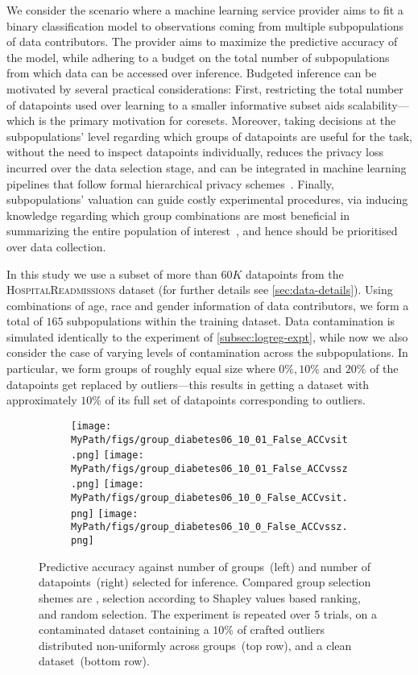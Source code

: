 We consider the scenario where a machine learning service provider aims to fit a binary classification model to observations coming from multiple subpopulations of data contributors. The provider aims to maximize the predictive accuracy of the model, while adhering to a budget on the total number of subpopulations from which data can be accessed over inference. Budgeted inference can be motivated by several practical considerations: First, restricting the total number of datapoints used over learning to a smaller informative subset aids scalability---which is the primary motivation for coresets. Moreover, taking decisions at the subpopulations' level regarding which groups of datapoints are useful for the task, without the need to inspect datapoints individually, reduces the privacy loss incurred over the data selection stage, and can be integrated in machine learning pipelines that follow formal hierarchical privacy schemes~\citep{balle19}. Finally, subpopulations' valuation can guide costly experimental procedures, via inducing knowledge regarding which group combinations are most beneficial in summarizing the entire population of interest~\citep{pinsler19, vahidian20}, and hence should be prioritised over data collection.

In this study we use a subset of more than $60K$ datapoints from the \textsc{HospitalReadmissions} dataset (for further details see \cref{sec:data-details}). Using combinations of age, race and gender information of data contributors, we form a total of $165$ subpopulations within the training dataset. Data contamination is simulated identically to the experiment of \cref{subsec:logreg-expt}, while now we also consider the case of varying levels of contamination across the subpopulations. In particular, we form groups of roughly equal size where $0\%, 10\%$ and $20\%$ of the datapoints get replaced by outliers---this results in getting a dataset with approximately $10\%$ of its full set of datapoints corresponding to outliers.


\begin{figure*}[!t]
	\begin{subfigure}[b]{0.99\textwidth} 
		\centering
		\texttt{[image: \\MyPath/figs/group\_diabetes06\_10\_01\_False\_ACCvsit.png]}
		\hfill
		\texttt{[image: \\MyPath/figs/group\_diabetes06\_10\_01\_False\_ACCvssz.png]}
		\centering
		\hfill
		\texttt{[image: \\MyPath/figs/group\_diabetes06\_10\_0\_False\_ACCvsit.png]}
		\centering
		\hfill
		\texttt{[image: \\MyPath/figs/group\_diabetes06\_10\_0\_False\_ACCvssz.png]}
	\end{subfigure}	
	\centering
	\caption{Predictive accuracy against number of groups~(left) and number of datapoints~(right) selected for inference. Compared group selection shemes are \bcores{}, selection according to Shapley values based ranking, and random selection. The experiment is repeated over $5$ trials, on a contaminated dataset containing a $10\%$ of crafted outliers distributed non-uniformly across groups~(top row), and a clean dataset~(bottom row).}
	\label{fig:group_plot}
\end{figure*}


